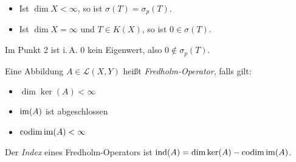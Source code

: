 \documentclass{cheat-sheet}
\newcommand{\codim}{\mathrm{codim}} %
\begin{document}

\begin{lem}
  \begin{itemize}
    \item Ist $\dim X < \infty$, so ist $\sigma(T) = \sigma_p(T)$.
    \item Ist $\dim X = \infty$ und $T \in K(X)$, so ist $0 \in \sigma(T)$.
  \end{itemize}
\end{lem}

\begin{bem}
  Im Punkt 2 ist i.\,A. $0$ kein Eigenwert, also $0 \not\in \sigma_p(T)$.
\end{bem}



\begin{defn}
  Eine Abbildung $A \in \mathcal{L}(X, Y)$ heißt \emph{Fredholm-Operator}, falls gilt:
  \begin{itemize}
    \item $\dim \ker(A) < \infty$
    \item $\mathop{\mathrm{im}}(A)$ ist abgeschlossen
    \item $\codim \im(A) < \infty$
  \end{itemize}
  Der \emph{Index} eines Fredholm-Operators ist $\mathrm{ind}(A) = \dim \ker (A) - \codim \im(A)$.
\end{defn}
\end{document}
